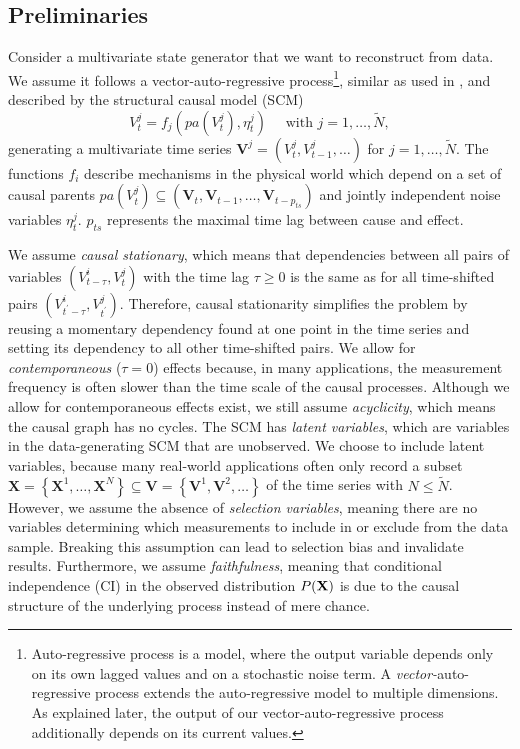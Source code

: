 \documentclass[conference]{IEEEtran}
\begin{document}
\subsection{Preliminaries}
Consider a multivariate state generator that we want to reconstruct from data.
We assume it follows a vector-auto-regressive process\footnote{Auto-regressive process is a model, where the output variable depends only on its own lagged values and on a stochastic noise term. A \textit{vector-}auto-regressive process extends the auto-regressive model to multiple dimensions. As explained later, the output of our vector-auto-regressive process additionally depends on its current values.}, similar as used in \cite{gerhardus_high-recall_2021}, and described by the structural causal model (SCM)
\begin{equation}
V_{t}^{j}=f_{j}\left(pa\left(V_{t}^{j}\right), \eta_{t}^{j}\right) \quad \text { with } j=1, \ldots, \tilde{N},
\end{equation}
generating a multivariate time series $\mathbf{V}^{j}=\left(V_{t}^{j}, V_{t-1}^{j}, \ldots\right)$ for $j=1, \ldots, \tilde{N}$.
The functions $f_i$ describe mechanisms in the physical world which depend on a set of causal parents $p a\left(V_{t}^{j}\right) \subseteq\left(\mathbf{V}_{t}, \mathbf{V}_{t-1}, \ldots, \mathbf{V}_{t-p_{t s}}\right)$ and jointly independent noise variables $\eta_{t}^{j}$. $p_{t s}$ represents the maximal time lag between cause and effect.

We assume \textit{causal stationary}, which means that dependencies between all pairs of variables $\left(V_{t-\tau}^{i}, V_{t^{}}^{j}\right)$ with the time lag $\tau \geq 0$ is the same as for all time-shifted pairs $\left(V_{t^{\prime}-\tau}^{i}, V_{t^{\prime}}^{j}\right)$\cite{runge_causal_2018}. Therefore, causal stationarity simplifies the problem by reusing a momentary dependency found at one point in the time series and setting its dependency to all other time-shifted pairs.
We allow for \textit{contemporaneous} ($\tau=0$) effects because, in many applications, the measurement frequency is often slower than the time scale of the causal processes. Although we allow for contemporaneous effects exist, we still assume \textit{acyclicity}, which means the causal graph has no cycles.
The SCM has \textit{latent variables}, which are variables in the data-generating SCM that are unobserved. We choose to include latent variables, because many real-world applications often only record a subset $\mathbf{X}=\left\{\mathbf{X}^{1}, \ldots, \mathbf{X}^{N}\right\} \subseteq \mathbf{V}=\left\{\mathbf{V}^{1}, \mathbf{V}^{2}, \ldots\right\}$ of the time series with $N \leq \tilde{N}$. 
However, we assume the absence of \textit{selection variables}, meaning there are no variables determining which measurements to include in or exclude from the data sample. Breaking this assumption can lead to selection bias and invalidate results.
Furthermore, we assume \textit{faithfulness}, meaning that conditional independence (CI) in the observed distribution $P(\bf{X})$ is due to the causal structure of the underlying process instead of mere chance\cite{gerhardus_high-recall_2021}.
\end{document}
